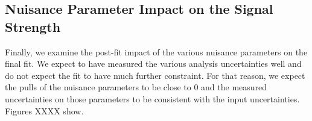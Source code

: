 \subsection{Nuisance Parameter Impact on the Signal Strength}

Finally, we examine the post-fit impact of the various nuisance parameters on the final fit. We expect to have measured the various analysis uncertainties well and do not expect the fit to have much further constraint. For that reason, we expect the pulls of the nuisance parameters to be close to 0 and the measured uncertainties on those parameters to be consistent with the input uncertainties. 
Figures XXXX show. 



